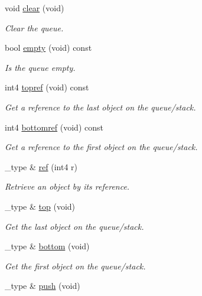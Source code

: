 \begin{DoxyCompactItemize}
void \mbox{\hyperlink{classcircularqueue_ac205d631400bc42fb797614c89e41c88}{clear}} (void)
\begin{DoxyCompactList}\small\item\em Clear the queue. \end{DoxyCompactList}\item 
bool \mbox{\hyperlink{classcircularqueue_ac4c5196899d81b6ff072e06a4e0e7893}{empty}} (void) const
\begin{DoxyCompactList}\small\item\em Is the queue empty. \end{DoxyCompactList}\item 
int4 \mbox{\hyperlink{classcircularqueue_acbefeb006bb33e353f7bded3b19f80e4}{topref}} (void) const
\begin{DoxyCompactList}\small\item\em Get a reference to the last object on the queue/stack. \end{DoxyCompactList}\item 
int4 \mbox{\hyperlink{classcircularqueue_af5fe2fe7f63076e4864c2f576ee45739}{bottomref}} (void) const
\begin{DoxyCompactList}\small\item\em Get a reference to the first object on the queue/stack. \end{DoxyCompactList}\item 
\+\_\+type \& \mbox{\hyperlink{classcircularqueue_ab48a0be1435caaf85a8aa96fa7fe5a9c}{ref}} (int4 r)
\begin{DoxyCompactList}\small\item\em Retrieve an object by its reference. \end{DoxyCompactList}\item 
\+\_\+type \& \mbox{\hyperlink{classcircularqueue_a665042a45ccb86bcb465d8b7f1efa9c5}{top}} (void)
\begin{DoxyCompactList}\small\item\em Get the last object on the queue/stack. \end{DoxyCompactList}\item 
\+\_\+type \& \mbox{\hyperlink{classcircularqueue_ab91d6ae625706c6ad18f1b5a2e2e238c}{bottom}} (void)
\begin{DoxyCompactList}\small\item\em Get the first object on the queue/stack. \end{DoxyCompactList}\item 
\+\_\+type \& \mbox{\hyperlink{classcircularqueue_a06f099e37388f3eccd8962f4d7199e17}{push}} (void)

\end{DoxyCompactItemize}
